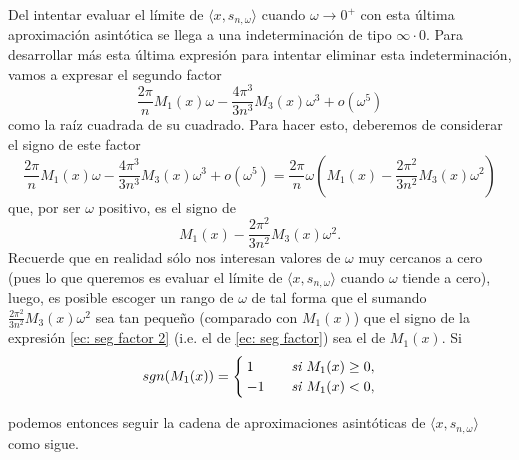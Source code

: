 Del intentar evaluar el límite de
$\langle x, s_{n, \omega} \rangle $ 
cuando $\omega \rightarrow 0^{+}$
con esta última aproximación asintótica se llega a una
indeterminación de tipo $\infty \cdot 0$.
Para desarrollar más esta última expresión para intentar
eliminar esta indeterminación, vamos a expresar 
el segundo factor 
\begin{equation}
\label{ec: seg factor}
\frac{2 \pi}{n} M_{1}(x) \omega - \frac{4 \pi^{3}}{3n^{3}}M_{3}(x) \omega^{3} 
 + o(\omega^{5})
\end{equation}
como la raíz cuadrada de su cuadrado.
Para hacer esto, deberemos de considerar el signo de este factor
\[
\frac{2 \pi}{n} M_{1}(x) \omega - \frac{4 \pi^{3}}{3n^{3}}M_{3}(x) \omega^{3} 
 + o(\omega^{5}) = 
 \frac{2\pi}{n} \omega \left(
 M_{1}(x) - \frac{2\pi^{2}}{3n^{2}}M_{3}(x)\omega^{2}
\right)
\]
que, por ser $\omega$ positivo, es el signo de 
\begin{equation}
\label{ec: seg factor 2}
M_{1}(x) - \frac{2\pi^{2}}{3n^{2}}M_{3}(x)\omega^{2}.
\end{equation}
Recuerde que en realidad sólo nos interesan valores de 
$\omega$ muy cercanos a cero (pues lo que queremos es evaluar
el límite de $\langle x, s_{n, \omega} \rangle$
cuando $\omega$ tiende a cero), luego, es posible escoger
un rango de $\omega$ de tal forma que el sumando 
$\frac{2\pi^{2}}{3n^{2}}M_{3}(x)\omega^{2}$ sea tan pequeño (comparado
con $M_{1}(x)$) que el signo de la expresión
\eqref{ec: seg factor 2}
(i.e. el de \eqref{ec: seg factor}) sea 
el de $M_{1}(x)$. Si
\begin{align*}
sgn(M_{1}(x))= \begin{cases}
1 & \hspace{0.2cm} \textit{ si } M_{1}(x) \geq 0, \\
-1 & \hspace{0.2cm} \textit{ si } M_{1}(x) < 0,
\end{cases}
\end{align*}

\noindent
podemos entonces seguir la cadena de
aproximaciones asintóticas de $\langle x, s_{n, \omega} \rangle$ 
como sigue.

